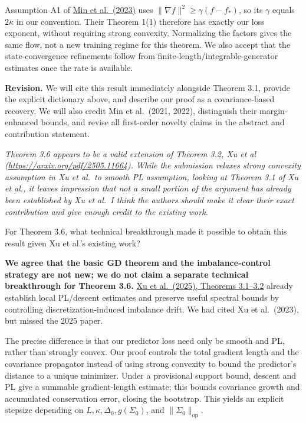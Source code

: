 \documentclass[11pt,a4paper]{article}
\renewenvironment{quote}
  {\par\addvspace{0.8em}\Needspace{8\baselineskip}%
    \list{}{\leftmargin=1.2em\rightmargin=0pt\topsep=0.25em
    \parsep=0.3em}\item\relax\normalsize\itshape\color{quotegray}}
  {\endlist\nopagebreak[4]}
\begin{document}
Assumption A1 of \href{https://proceedings.mlr.press/v202/min23d/min23d.pdf}{Min et al.~(2023)} uses \(\|\nabla f\|^2\ge\gamma(f-f_*)\), so its \(\gamma\) equals \(2\kappa\) in our convention. Their Theorem 1(1) therefore has exactly our loss exponent, without requiring strong convexity. Normalizing the factors gives the same flow, not a new training regime for this theorem. We also accept that the state-convergence refinements follow from finite-length/integrable-generator estimates once the rate is available.

\textbf{Revision.} We will cite this result immediately alongside Theorem 3.1, provide the explicit dictionary above, and describe our proof as a covariance-based recovery. We will also credit Min et al.~(2021, 2022), distinguish their margin-enhanced bounds, and revise all first-order novelty claims in the abstract and contribution statement.

\begin{quote}
Theorem 3.6 appears to be a valid extension of Theorem 3.2, Xu et al (\url{https://arxiv.org/pdf/2505.11664}). While the submission relaxes strong convexity assumption in Xu et al.~to smooth PL assumption, looking at Theorem 3.1 of Xu et al., it leaves impression that not a small portion of the argument has already been established by Xu et al.~I think the authors should make it clear their exact contribution and give enough credit to the existing work.

For Theorem 3.6, what technical breakthrough made it possible to obtain this result given Xu et al.'s existing work?
\end{quote}

\textbf{We agree that the basic GD theorem and the imbalance-control strategy are not new; we do not claim a separate technical breakthrough for Theorem 3.6.} \href{https://arxiv.org/html/2505.11664v1}{Xu et al.~(2025), Theorems 3.1--3.2} already establish local PL/descent estimates and preserve useful spectral bounds by controlling discretization-induced imbalance drift. We had cited Xu et al.~(2023), but missed the 2025 paper.

The precise difference is that our predictor loss need only be smooth and PL, rather than strongly convex. Our proof controls the total gradient length and the covariance propagator instead of using strong convexity to bound the predictor's distance to a unique minimizer. Under a provisional support bound, descent and PL give a summable gradient-length estimate; this bounds covariance growth and accumulated conservation error, closing the bootstrap. This yields an explicit stepsize depending on \(L,\kappa,\Delta_0,g(\Sigma_0)\), and \(\|\Sigma_0\|_{\mathrm{op}}\).
\end{document}
